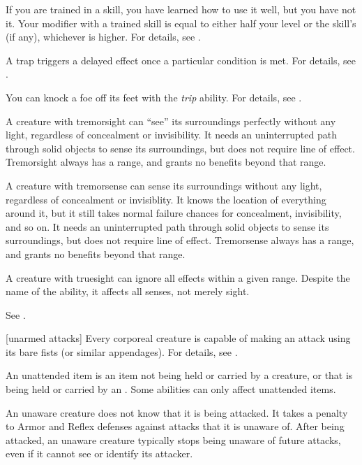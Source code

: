  If you are trained in a skill, you have learned how to use it well, but you have not  it.
Your modifier with a trained skill is equal to either half your level  or the skill's  (if any), whichever is higher.
For details, see .

 A trap triggers a delayed effect once a particular condition is met.
For details, see .

 You can knock a foe off its feet with the \textit{trip} ability.
For details, see .

 A creature with tremorsight can ``see'' its surroundings perfectly without any light, regardless of concealment or invisibility.
It needs an uninterrupted path through solid objects to sense its surroundings, but does not require line of effect.
Tremorsight always has a range, and grants no benefits beyond that range.

 A creature with tremorsense can sense its surroundings without any light, regardless of concealment or invisiblity.
It knows the location of everything around it, but it still takes normal failure chances for concealment, invisibility, and so on.
It needs an uninterrupted path through solid objects to sense its surroundings, but does not require line of effect.
Tremorsense always has a range, and grants no benefits beyond that range.

 A creature with truesight can ignore all  effects within a given range.
Despite the name of the ability, it affects all senses, not merely sight.

 See .

[unarmed attacks] Every corporeal creature is capable of making an attack using its bare fists (or similar appendages).
For details, see .

 An unattended item is an item not being held or carried by a creature, or that is being held or carried by an .
Some abilities can only affect unattended items.

 An unaware creature does not know that it is being attacked.
It takes a  penalty to Armor and Reflex defenses against attacks that it is unaware of.
After being attacked, an unaware creature typically stops being unaware of future attacks, even if it cannot see or identify its attacker.

